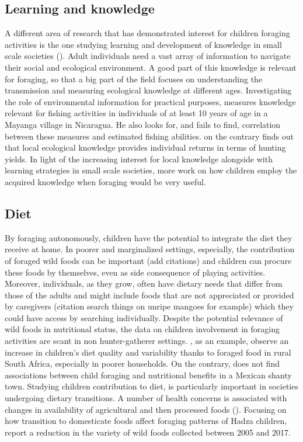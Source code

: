 \subsection{Learning and knowledge}
A different area of research that has demonstrated interest for children foraging activities is the one studying learning and development of knowledge in small scale societies (\cite{gallois_local_2017, koster_wisdom_2016, lew-levy_how_2017, lew-levy_who_2019, reyes-garcia_adaptive_2016, setalaphruk_childrens_2007}). Adult individuals need a vast array of information to navigate their social and ecological environment. A good part of this knowledge is relevant for foraging, so that a big part of the field focuses on understanding the transmission and measuring ecological knowledge at different ages. Investigating the role of environmental information for practical purposes, \cite{koster_wisdom_2016} measures knowledge relevant for fishing activities in individuals of at least 10 years of age in a Mayanga village in Nicaragua. He also looks for, and fails to find, correlation between these measures and estimated fishing abilities. \cite{reyes-garcia_adaptive_2016} on the contrary finds out that local ecological knowledge provides individual returns in terms of hunting yields. In light of the increasing interest for local knowledge alongside with learning strategies in small scale societies, more work on how children employ the acquired knowledge when foraging would be very useful. 

\subsection{Diet}
By foraging autonomously, children have the potential to integrate the diet they receive at home. In poorer and marginalized settings, especially, the contribution of foraged wild foods can be important (add citations) and children can procure these foods by themselves, even as side consequence of playing activities. Moreover, individuals, as they grow, often have dietary needs that differ from those of the adults and might include foods that are not appreciated or provided by caregivers (citation search things on unripe mangoes for example) which they could have access by searching individually.  
Despite the potential relevance of wild foods in nutritional status, the data on children involvement in foraging activities are scant in non hunter-gatherer settings. 
\cite{mcgarry_children_2009}, as an example, observe an increase in children's diet quality and variability thanks to foraged food in rural South Africa, especially in poorer households. On the contrary, \cite{lee_childrens_2009} does not find associations between child foraging and nutritional benefits in a Mexican shanty town. 
Studying children contribution to diet, is particularly important in societies undergoing dietary transitions. A number of health concerns is associated with changes in availability of agricultural and then processed foods (\cite{satia_dietary_2010}). Focusing on how transition to domesticate foods affect foraging patterns of Hadza children, \cite{pollom_changes_2020} report a reduction in the variety of wild foods collected between 2005 and 2017. 

